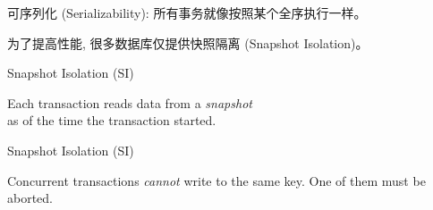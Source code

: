 
\begin{frame}{}
\end{frame}

\begin{frame}{}
  \begin{center}
    可序列化 (Serializability): 所有事务就像按照某个全序执行一样。

    \vspace{0.30cm}
  \end{center}
\end{frame}

\begin{frame}{}
  \begin{center}
    为了提高性能, 很多数据库仅提供快照隔离 (Snapshot Isolation)。

    \vspace{0.30cm}
  \end{center}
\end{frame}

\begin{frame}{Snapshot Isolation (SI)}
  \begin{center}
		\resizebox{0.50\textwidth}{!}{}

    \vspace{0.20cm}
     Each transaction reads data from a {\it snapshot} \\
      as of the time the transaction started.
  \end{center}
\end{frame}

\begin{frame}{Snapshot Isolation (SI)}
  \begin{center}
    \resizebox{0.48\textwidth}{!}{}
  \end{center}

  \vspace{-0.50cm}
    Concurrent transactions {\it cannot} write to the same key.
    One of them must be aborted.
\end{frame}

